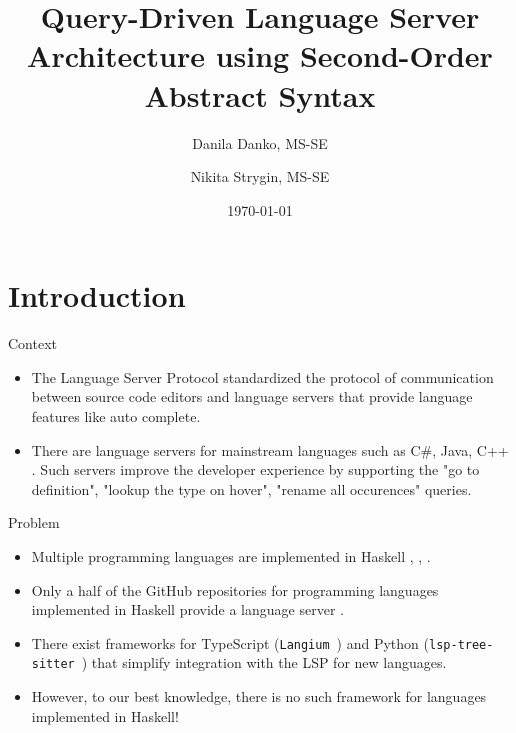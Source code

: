 \documentclass[serif, aspectratio=169]{beamer}
\author[Danko, Strygin]{Danila Danko, MS-SE \inst{1} \and Nikita Strygin, MS-SE \inst{1} \and \newline \newline {Supervisor: Nikolai Kudasov \inst{1}}}
\title{Query-Driven Language Server Architecture using Second-Order Abstract Syntax}
\institute{
    \inst{1}Innopolis University
}
\date{\small \today}
\begin{document}
\begin{frame}
    \titlepage
\end{frame}

\begin{frame}
    \tableofcontents[sectionstyle=show,
        subsectionstyle=show/shaded/hide,
        subsubsectionstyle=show/shaded/hide]
\end{frame}

\section{Introduction}

\begin{frame}{Context}
    \begin{itemize}
        [<+-| alert+>] %
        \item The Language Server Protocol \cite{noauthor_language_server_protocol_2024} standardized the protocol of communication between source code editors and language servers that provide language features like auto complete.
        \item There are language servers for mainstream languages such as C\#, Java, C++ \cite{lsp_implementations}. Such servers improve the developer experience by supporting the "go to definition", "lookup the type on hover", "rename all occurences" queries.
    \end{itemize}
\end{frame}

\begin{frame}{Problem}
    \begin{itemize}
        [<+-| alert+>] %
        \item Multiple programming languages are implemented in Haskell \cite{github_haskell_programming_language}, \cite{hackage_formal_languages}, \cite{hackage_language}.
        \item Only a half of the GitHub repositories for programming languages implemented in Haskell provide a language server \cite{github_lsp_module}.
        \item There exist frameworks for TypeScript (\texttt{Langium}~\cite{noauthor_langium_nodate}) and Python (\texttt{lsp-tree-sitter}~\cite{noauthor_neomuttlsp-tree-sitter_2024}) that simplify integration with the LSP for new languages.
        \item However, to our best knowledge, there is no such framework for languages implemented in Haskell!
    \end{itemize}
\end{frame}
\end{document}
